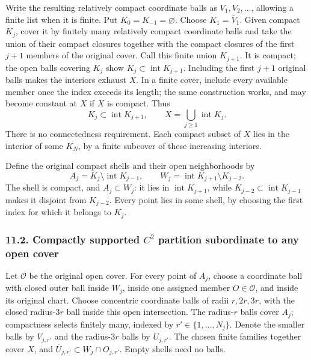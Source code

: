 \documentclass[
  11pt,
]{article}
\begin{document}
Write the resulting relatively compact coordinate balls as
\(V_1,V_2,\ldots\), allowing a finite list when it is finite. Put
\(K_0=K_{-1}=\varnothing\). Choose \(K_1=\overline V_1\). Given compact
\(K_j\), cover it by finitely many relatively compact coordinate balls
and take the union of their compact closures together with the compact
closures of the first \(j+1\) members of the original cover. Call this
finite union \(K_{j+1}\). It is compact; the open balls covering \(K_j\)
show \(K_j\subset\operatorname{int}K_{j+1}\). Including the first
\(j+1\) original balls makes the interiors exhaust \(X\). In a finite
cover, include every available member once the index exceeds its length;
the same construction works, and may become constant at \(X\) if \(X\)
is compact. Thus \[
 K_j\subset\operatorname{int}K_{j+1},\qquad
 X=\bigcup_{j\geq1}\operatorname{int}K_j .
                                                               \tag{MG1}
\] There is no connectedness requirement. Each compact subset of \(X\)
lies in the interior of some \(K_N\), by a finite subcover of these
increasing interiors.

Define the original compact shells and their open neighborhoods by \[
 A_j=K_j\setminus\operatorname{int}K_{j-1},\qquad
 W_j=\operatorname{int}K_{j+1}\setminus K_{j-2}.
                                                               \tag{MG2}
\] The shell is compact, and \(A_j\subset W_j\): it lies in
\(\operatorname{int}K_{j+1}\), while
\(K_{j-2}\subset\operatorname{int}K_{j-1}\) makes it disjoint from
\(K_{j-2}\). Every point lies in some shell, by choosing the first index
for which it belongs to \(K_j\).

\subsubsection{\texorpdfstring{11.2. Compactly supported \(C^2\)
partition subordinate to any open
cover}{11.2. Compactly supported C\^{}2 partition subordinate to any open cover}}\label{compactly-supported-c2-partition-subordinate-to-any-open-cover}

Let \(\mathcal O\) be the original open cover. For every point of
\(A_j\), choose a coordinate ball with closed outer ball inside \(W_j\),
inside one assigned member \(O\in\mathcal O\), and inside its original
chart. Choose concentric coordinate balls of radii \(r,2r,3r\), with the
closed radius-\(3r\) ball inside this open intersection. The
radius-\(r\) balls cover \(A_j\); compactness selects finitely many,
indexed by \(r'\in\{1,\ldots,N_j\}\). Denote the smaller balls by
\(V_{j,r'}\) and the radius-\(3r\) balls by \(U_{j,r'}\). The chosen
finite families together cover \(X\), and
\(\overline U_{j,r'}\subset W_j\cap O_{j,r'}\). Empty shells need no
balls.
\end{document}
